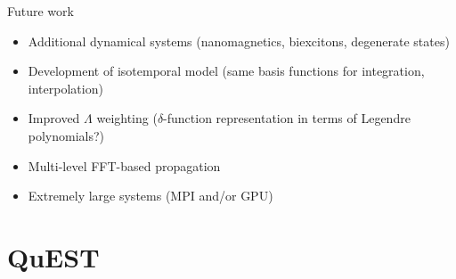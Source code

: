 \documentclass[aspectratio=169, usenames, dvipsnames]{beamer}
\begin{document}
\begin{frame}{Future work}
  \begin{itemize}
    \item Additional dynamical systems (nanomagnetics, biexcitons, degenerate states)
    \item Development of isotemporal model (same basis functions for integration, interpolation)
    \item Improved $\Lambda$ weighting ($\delta$-function representation in terms of Legendre polynomials?)
    \item Multi-level FFT-based propagation
    \item Extremely large systems (MPI and/or GPU)
  \end{itemize}
\end{frame}

\section{QuEST}
\end{document}
